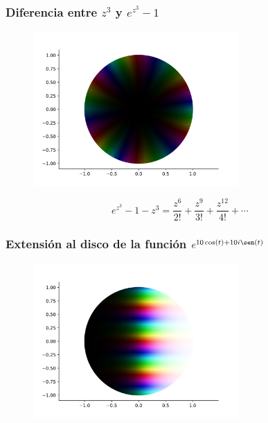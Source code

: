 \documentclass[spanish, a4paper, 12pt, final, slideColor, nototal, colorBG, pdf, noaccumulate, darkblue]{beamer}
\begin{document}
\begin{frame}
    \frametitle{Diferencia entre $z^3$ y $e^{z^3}-1$}
    \begin{figure}[!htbp]
        \centering
        \includegraphics[width=0.7\textwidth]{../Aplicacion/diff6.png}
        \label{fig:diff6}
    \end{figure}
    \begin{equation*}
        e^{z^3} - 1 - z^3 = \frac{z^6}{2!} + \frac{z^9}{3!} + \frac{z^{12}}{4!} + \cdots
    \end{equation*}

\end{frame}

\begin{frame}
    \frametitle{Extensión al disco de la función $e^{10 \cos(t)+10i \sen(t)}$}
    \begin{figure}[!htbp]
        \centering
        \includegraphics[width=0.7\textwidth]{../Aplicacion/e^(10cos(t)+10isen(t)).png}
        \label{fig:comp_e^z}
    \end{figure}
\end{frame}
\end{document}
